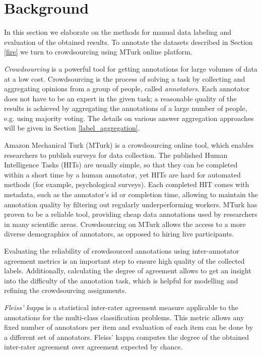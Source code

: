 \section{Background}

In this section we elaborate on the methods for manual data labeling and evaluation of the obtained results. To annotate the datasets described in Section \ref{fire} we turn to crowdsourcing using MTurk online platform.

\textit{Crowdsourcing} is a powerful tool for getting annotations for large volumes of data at a low cost. Crowdsourcing is the process of solving a task by collecting and aggregating opinions from a group of people, called \textit{annotators}. Each annotator does not have to be an expert in the given task; a reasonable quality of the results is achieved by aggregating the annotations of a large number of people, e.g. using majority voting. The details on various answer aggregation approaches will be given in Section \ref{label_aggregation}.

 Amazon Mechanical Turk (MTurk) is a crowdsourcing online tool, which enables researchers to publish surveys for data collection. The published Human Intelligence Tasks (HITs) are usually simple, so that they can be completed within a short time by a human annotator, yet HITs are hard for automated methods (for example, psychological surveys). Each completed HIT comes with metadata, such as the annotator's id or completion time, allowing to maintain the annotation quality by filtering out regularly underperforming workers. MTurk has proven to be a reliable tool, providing cheap data annotations \cite{peer2017beyond} used by researchers in many scientific areas. Crowdsourcing on MTurk allows the access to a more diverse demographics of annotators, as opposed to hiring live participants.

 Evaluating the reliability of crowdsourced annotations using inter-annotator agreement metrics
is an important step to ensure high quality of the collected labels. Additionally, calculating the degree of agreement allows to get an insight into the difficulty of the annotation task, which is helpful for modelling and refining the crowdsourcing assignments.

\textit{Fleiss' kappa} \cite{fleiss1971measuring} is a statistical inter-rater agreement measure applicable to the annotations for the multi-class classification problems. This metric allows any fixed number of annotators per item and evaluation of each item can be done by a different set of annotators. Fleiss' kappa computes the degree of the obtained inter-rater agreement over agreement expected by chance.

